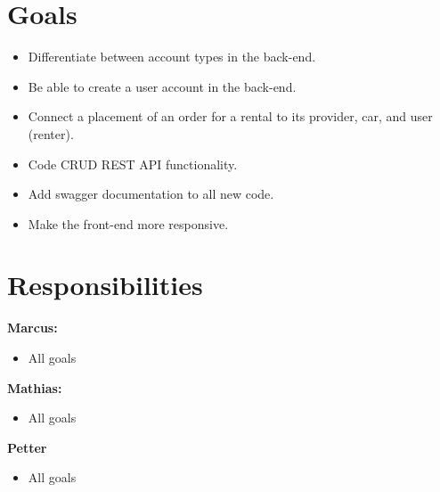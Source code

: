 \documentclass[a4paper,12pt]{article}
\begin{document}
\section{\textbf{Goals}}
\begin{itemize}
    \item Differentiate between account types in the back-end.
    \item Be able to create a user account in the back-end.
    \item Connect a placement of an order for a rental to its provider, car, and user (renter).
    \item Code CRUD REST API functionality.
    \item Add swagger documentation to all new code.
    \item Make the front-end more responsive.
\end{itemize}

\section{Responsibilities}
\textbf{Marcus:}
\begin{itemize}
    \item All goals
\end{itemize}
\textbf{Mathias:}
\begin{itemize}
    \item     All goals
\end{itemize}
\textbf{Petter}
\begin{itemize}
    \item     All goals
\end{itemize}
\end{document}
